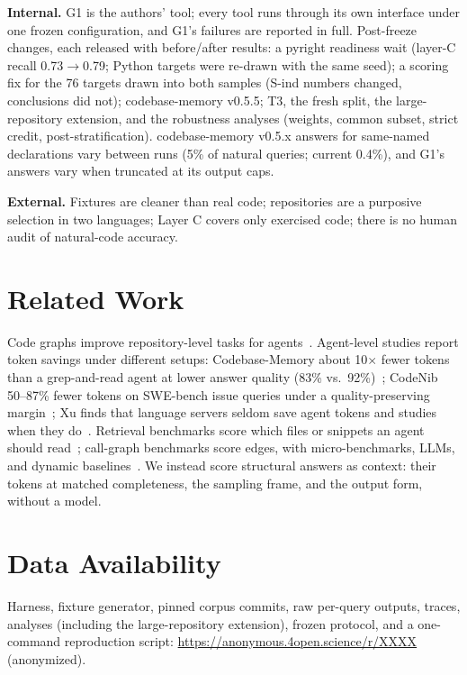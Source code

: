 \documentclass[conference]{IEEEtran}
\newcommand{\cbm}{codebase-memory\xspace}
\begin{document}
\textbf{Internal.}
G1 is the authors' tool; every tool runs through its own interface under one frozen configuration, and G1's failures are reported in full.
Post-freeze changes, each released with before/after results:
a pyright readiness wait (layer-C recall 0.73$\rightarrow$0.79; Python targets were re-drawn with the same seed);
a scoring fix for the 76 targets drawn into both samples (S-ind numbers changed, conclusions did not);
\cbm v0.5.5;
T3, the fresh split, the large-repository extension, and the robustness analyses (weights, common subset, strict credit, post-stratification).
\cbm v0.5.x answers for same-named declarations vary between runs (5\% of natural queries; current 0.4\%), and G1's answers vary when truncated at its output caps.

\textbf{External.}
Fixtures are cleaner than real code; repositories are a purposive selection in two languages; Layer C covers only exercised code; there is no human audit of natural-code accuracy.

\section{Related Work}
Code graphs improve repository-level tasks for agents~\cite{repograph,codexgraph,locagent}.
Agent-level studies report token savings under different setups: Codebase-Memory about 10$\times$ fewer tokens than a grep-and-read agent at lower answer quality (83\% vs.\ 92\%)~\cite{codebasememory}; CodeNib 50--87\% fewer tokens on SWE-bench issue queries under a quality-preserving margin~\cite{codenib}; Xu finds that language servers seldom save agent tokens and studies when they do~\cite{xu_lsp}.
Retrieval benchmarks score which files or snippets an agent should read~\cite{agentretrieval,corebench}; call-graph benchmarks score edges, with micro-benchmarks, LLMs, and dynamic baselines~\cite{pycg,swarm,dypybench,totalrecall}.
We instead score structural answers as context: their tokens at matched completeness, the sampling frame, and the output form, without a model.

\section{Data Availability}
Harness, fixture generator, pinned corpus commits, raw per-query outputs, traces, analyses (including the large-repository extension), frozen protocol, and a one-command reproduction script: \url{https://anonymous.4open.science/r/XXXX} (anonymized).
\end{document}

